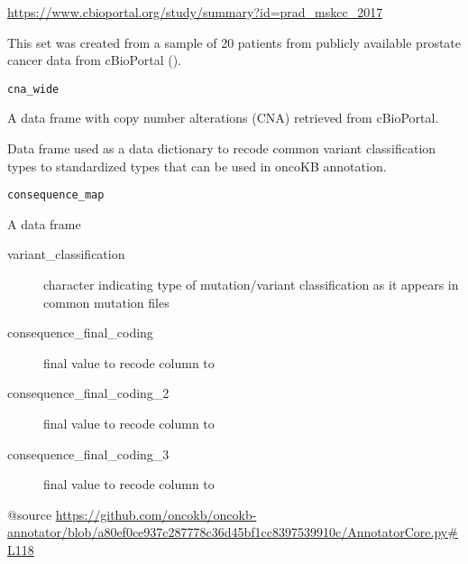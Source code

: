 \documentclass[a4paper]{book}
\begin{document}
%
\begin{Source}\relax
\url{https://www.cbioportal.org/study/summary?id=prad_mskcc_2017}
\end{Source}
%
\begin{Description}\relax
This set was created from a sample of 20 patients from
publicly available prostate cancer data from cBioPortal ().
\end{Description}
%
\begin{Usage}
\begin{verbatim}
cna_wide
\end{verbatim}
\end{Usage}
%
\begin{Format}
A data frame with copy number alterations (CNA) retrieved from cBioPortal.
\end{Format}
%
\begin{Description}\relax
Data frame used as a data dictionary to recode common variant classification types
to standardized types that can be used in oncoKB annotation.
\end{Description}
%
\begin{Usage}
\begin{verbatim}
consequence_map
\end{verbatim}
\end{Usage}
%
\begin{Format}
A data frame
\begin{description}

\item[variant\_classification] character indicating type of mutation/variant classification as it appears in common mutation files
\item[consequence\_final\_coding] final value to recode  column to
\item[consequence\_final\_coding\_2] final value to recode  column to
\item[consequence\_final\_coding\_3] final value to recode  column to

\end{description}

@source \url{https://github.com/oncokb/oncokb-annotator/blob/a80ef0ce937c287778c36d45bf1cc8397539910c/AnnotatorCore.py\#L118}
\end{Format}
\end{document}
